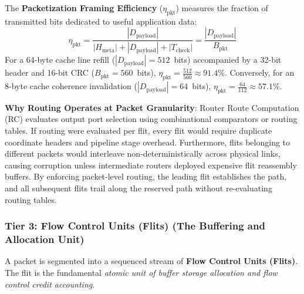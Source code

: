 The \textbf{Packetization Framing Efficiency} ($\eta_{\text{pkt}}$) measures the fraction of transmitted bits dedicated to useful application data:
\begin{equation}
\eta_{\text{pkt}} = \frac{|D_{\text{payload}}|}{|H_{\text{meta}}| + |D_{\text{payload}}| + |T_{\text{check}}|} = \frac{|D_{\text{payload}}|}{B_{\text{pkt}}}
\label{eq:ch2_framing_efficiency}
\end{equation}
For a 64-byte cache line refill ($|D_{\text{payload}}| = 512$~bits) accompanied by a 32-bit header and 16-bit CRC ($B_{\text{pkt}} = 560$~bits), $\eta_{\text{pkt}} = \frac{512}{560} \approx 91.4\%$. Conversely, for an 8-byte cache coherence invalidation ($|D_{\text{payload}}| = 64$~bits), $\eta_{\text{pkt}} = \frac{64}{112} \approx 57.1\%$.

\begin{svgraybox}
\textbf{Why Routing Operates at Packet Granularity}:
Router Route Computation (RC) evaluates output port selection using combinational comparators or routing tables. If routing were evaluated per flit, every flit would require duplicate coordinate headers and pipeline stage overhead. Furthermore, flits belonging to different packets would interleave non-deterministically across physical links, causing corruption unless intermediate routers deployed expensive flit reassembly buffers. By enforcing packet-level routing, the leading flit establishes the path, and all subsequent flits trail along the reserved path without re-evaluating routing tables.
\end{svgraybox}

\subsubsection{Tier 3: Flow Control Units (Flits) (The Buffering and Allocation Unit)}
A packet is segmented into a sequenced stream of \textbf{Flow Control Units (Flits)}. The flit is the fundamental \emph{atomic unit of buffer storage allocation and flow control credit accounting}.


